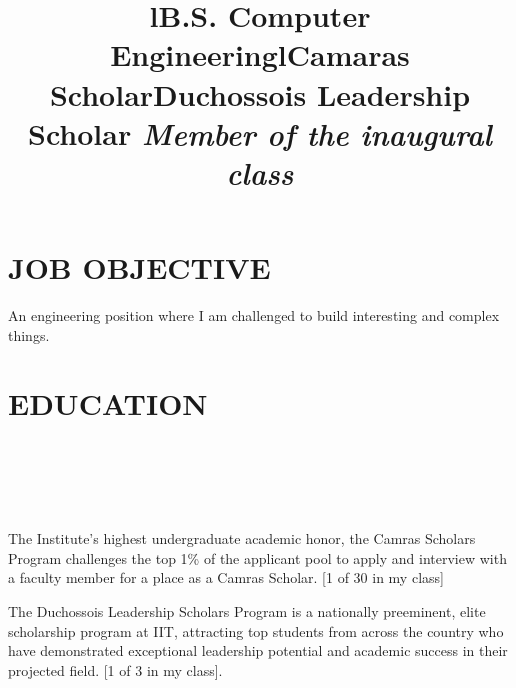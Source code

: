 \documentclass{res}
\begin{document}
 

\address{\bf  PRESENT ADDRESS\\3366 S. Michigan Ave \\Chicago, IL 60616\\(630) 450-5725}
\address{\bf PERMANENT ADDRESS \\2558 Breckeridge Ct.\\Aurora, IL 60504 \\  (630) 978-1952}
                                  
                                  
\begin{resume}
\section{JOB OBJECTIVE}          
    An engineering position where I am challenged to build interesting and complex things.
 
\section{EDUCATION}          

\begin{format}
  \title{l}  \\
\end{format}
\title{B.S. Computer Engineering}
\begin{position}
\end{position}

\begin{format}
  \title{l}\\
  \body\\
\end{format}
\title{\bf Camaras Scholar}
\begin{position}
        The Institute's highest undergraduate academic honor, the Camras Scholars Program challenges the top 1\% of the applicant pool to apply and interview with a faculty member for a place as a Camras Scholar. [1 of 30 in my class]
\end{position}

\title{{\bf Duchossois Leadership Scholar} \emph{Member of the inaugural class}}
\begin{position}
  The Duchossois Leadership Scholars Program is a nationally preeminent, elite scholarship program at IIT, attracting top students from across the country who have demonstrated exceptional leadership potential and academic success in their projected field. [1 of 3 in my class]. 
\end{position}
 

\end{resume}
\end{document}

